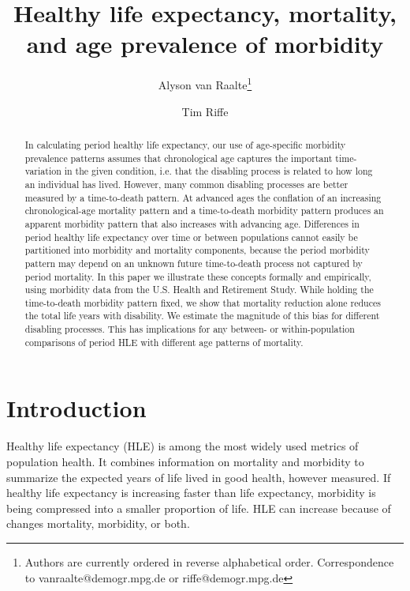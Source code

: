\documentclass[11pt,oneside,a4paper]{article} %
\begin{document}
\title{Healthy life expectancy, mortality, and age prevalence of morbidity}

\author[1]{Alyson van Raalte\thanks{Authors are currently ordered in reverse
alphabetical order. Correspondence to vanraalte@demogr.mpg.de or
riffe@demogr.mpg.de}}
\author[1]{Tim Riffe}


\maketitle

\begin{abstract}
In calculating period healthy life expectancy, our use of age-specific morbidity
prevalence patterns assumes that chronological age captures the important
time-variation in the given condition, i.e.
that the disabling process is related to how long an individual has lived.
However, many common disabling processes are better measured by a time-to-death
pattern. At advanced ages the conflation of an increasing chronological-age
mortality pattern and a time-to-death morbidity pattern produces an apparent morbidity pattern that also increases with advancing age. Differences in period healthy life expectancy over time or between populations
cannot easily be partitioned into morbidity and mortality components, because
the period morbidity pattern may depend on an unknown future time-to-death
process not captured by period mortality. In this paper we illustrate these
concepts formally and empirically, using morbidity data from the U.S. Health and Retirement Study. While holding
the time-to-death morbidity pattern fixed, we show that mortality reduction
alone reduces the total life years with disability. We estimate the magnitude of this bias for different disabling processes. This has implications for any between- or within-population comparisons of period HLE with different age patterns of mortality.
\end{abstract}

\newpage
\section{Introduction}

Healthy life expectancy (HLE) is among the most widely used metrics of
population health. It combines information on mortality and morbidity to summarize the expected years of life lived in good health, however measured. If healthy life expectancy is increasing faster than life expectancy, morbidity is being compressed into a smaller proportion of life. HLE can increase because of changes mortality, morbidity, or both.
\end{document}
